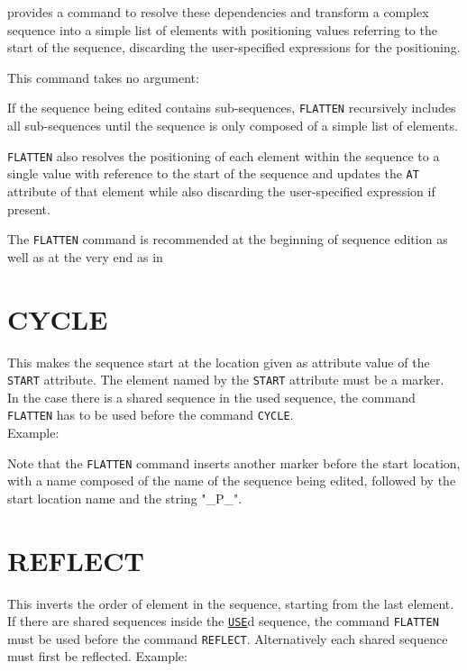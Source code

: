 \madx provides a command to resolve these dependencies and transform a complex 
sequence into a simple list of elements with positioning values referring to 
the start of the sequence, discarding the user-specified expressions for the 
positioning.

This command takes no argument: 

If the sequence being edited contains sub-sequences, {\tt FLATTEN} recursively 
includes all sub-sequences until the sequence is only composed of a simple list 
of elements. 

{\tt FLATTEN} also resolves the positioning of each element within the sequence 
to a single value with reference to the start of the sequence and updates the 
{\tt AT} attribute of that element while also discarding the user-specified 
expression if present.

The {\tt FLATTEN} command is recommended at the beginning of sequence edition 
as well as at the very end as in

\section{CYCLE}
\label{sec:cycle}
This makes the sequence start at the location given as attribute value of the {\tt START} 
attribute. The element named by the {\tt START} attribute must be a marker. \\ 
In the case there is a shared sequence in the used sequence, the
command {\tt FLATTEN} has to be used before the command {\tt CYCLE}. \\
Example:  

Note that the {\tt FLATTEN} command inserts another marker before the start location, 
with a name composed of the name of the sequence being edited, followed by the 
start location name and the string "\_P\_". 

\section{REFLECT}
\label{sec:reflect}
This inverts the order of element in the sequence, starting from the
last element. \\ 
If there are shared sequences inside the \hyperref[sec:use]{\tt USE}d sequence, 
the command
{\tt FLATTEN} must be used before the command {\tt REFLECT}.  
Alternatively each shared sequence must first be reflected. Example:   


